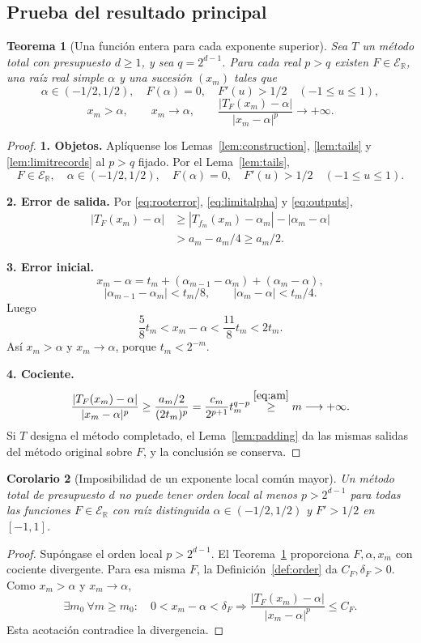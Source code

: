 \documentclass[11pt,a4paper]{article}
\numberwithin{equation}{section}
\newtheorem{theorem}{Teorema}[section]
\newtheorem{corollary}[theorem]{Corolario}
\theoremstyle{definition}
\theoremstyle{remark}
\newcommand{\R}{\mathbb R}
\newcommand{\ER}{\mathcal E_{\R}}
\newcommand{\paso}[1]{\par\smallskip\noindent\textbf{#1}\quad}
\begin{document}
\subsection{Prueba del resultado principal}
\begin{theorem}[Una función entera para cada exponente superior]\label{thm:main}
Sea $T$ un método total con presupuesto $d\ge1$, y sea $q=2^{d-1}$. Para cada real $p>q$ existen $F\in\ER$, una raíz real simple $\alpha$ y una sucesión $(x_m)$ tales que
\[
\alpha\in(-1/2,1/2),\quad F(\alpha)=0,\quad
F'(u)>1/2\quad(-1\le u\le1),
\]
\[
x_m>\alpha,\qquad x_m\longrightarrow\alpha,
\qquad
\frac{|T_F(x_m)-\alpha|}{|x_m-\alpha|^p}\longrightarrow+\infty.
\]
\end{theorem}
\begin{proof}
\paso{1. Objetos.}
Aplíquense los Lemas~\ref{lem:construction}, \ref{lem:tails} y \ref{lem:limitrecords} al $p>q$ fijado. Por el Lema~\ref{lem:tails},
\[
F\in\ER,\quad \alpha\in(-1/2,1/2),\quad F(\alpha)=0,\quad
F'(u)>1/2\quad(-1\le u\le1).
\]
\paso{2. Error de salida.}
Por \eqref{eq:rooterror}, \eqref{eq:limitalpha} y \eqref{eq:outputs},
\begin{align*}
|T_F(x_m)-\alpha|
&\ge|T_{f_m}(x_m)-\alpha_m|-|\alpha_m-\alpha|\\
&>a_m-a_m/4\ge a_m/2.
\end{align*}
\paso{3. Error inicial.}
\[
x_m-\alpha=t_m+(\alpha_{m-1}-\alpha_m)+(\alpha_m-\alpha),
\]
\[
|\alpha_{m-1}-\alpha_m|<t_m/8,\qquad |\alpha_m-\alpha|<t_m/4.
\]
Luego
\begin{equation}\label{eq:positiveerror}
\frac58t_m<x_m-\alpha<\frac{11}{8}t_m<2t_m.
\end{equation}
Así $x_m>\alpha$ y $x_m\to\alpha$, porque $t_m<2^{-m}$.
\paso{4. Cociente.}
\[
\frac{|T_F(x_m)-\alpha|}{|x_m-\alpha|^p}
\ge\frac{a_m/2}{(2t_m)^p}
=\frac{c_m}{2^{p+1}}t_m^{q-p}
\overset{\eqref{eq:am}}{\ge}m\longrightarrow+\infty.
\]
Si $T$ designa el método completado, el Lema~\ref{lem:padding} da las mismas salidas del método original sobre $F$, y la conclusión se conserva.
\end{proof}

\begin{corollary}[Imposibilidad de un exponente local común mayor]\label{cor:totalbound}
Un método total de presupuesto $d$ no puede tener orden local al menos $p>2^{d-1}$ para todas las funciones $F\in\ER$ con raíz distinguida $\alpha\in(-1/2,1/2)$ y $F'>1/2$ en $[-1,1]$.
\end{corollary}
\begin{proof}
Supóngase el orden local $p>2^{d-1}$. El Teorema~\ref{thm:main} proporciona $F,\alpha,x_m$ con cociente divergente. Para esa misma $F$, la Definición~\ref{def:order} da $C_F,\delta_F>0$. Como $x_m>\alpha$ y $x_m\to\alpha$,
\[
\exists m_0\ \forall m\ge m_0:\quad0<x_m-\alpha<\delta_F
\Longrightarrow \frac{|T_F(x_m)-\alpha|}{|x_m-\alpha|^p}\le C_F.
\]
Esta acotación contradice la divergencia.
\end{proof}
\end{document}
